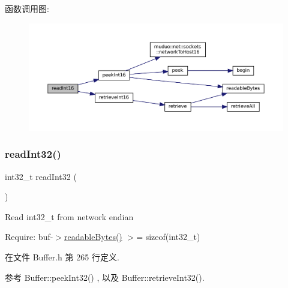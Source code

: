 函数调用图\+:
\nopagebreak
\begin{figure}[H]
\begin{center}
\leavevmode
\includegraphics[width=350pt]{classmuduo_1_1net_1_1Buffer_a7cf018b7a5d7bed8aa4d201e4399fce0_cgraph}
\end{center}
\end{figure}
\mbox{\label{classmuduo_1_1net_1_1Buffer_adbc23fa2b53ee3f0bd8cc0af521900d4}} 
\subsubsection{\texorpdfstring{read\+Int32()}{readInt32()}}
{\footnotesize\ttfamily int32\+\_\+t read\+Int32 (\begin{DoxyParamCaption}{ }\end{DoxyParamCaption})\hspace{0.3cm}{\ttfamily [inline]}}

Read int32\+\_\+t from network endian

Require\+: buf-\/$>$\hyperlink{classmuduo_1_1net_1_1Buffer_afba1d23196411daa43950fdbbff6d724}{readable\+Bytes()} $>$= sizeof(int32\+\_\+t) 

在文件 Buffer.\+h 第 265 行定义.



参考 Buffer\+::peek\+Int32() , 以及 Buffer\+::retrieve\+Int32().

